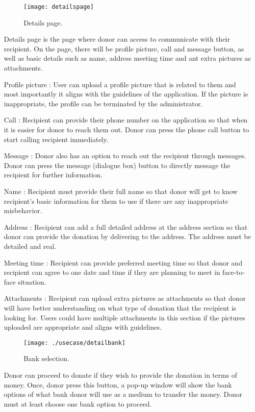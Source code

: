 \documentclass[conference]{IEEEtran}
\begin{document}
\begin{figure}[h!]
\texttt{[image: detailspage]}
\centering
\caption{Details page.}
\end{figure}

Details page is the page where donor can access to communicate with their recipient. On the page, there will be profile picture, call and message button, as well as basic details such as name, address meeting time and ant extra pictures as attachments.

Profile picture : User can upload a profile picture that is related to them and most importantly it aligns with the guidelines of the application. If the picture is inappropriate, the profile can be terminated by the administrator.

Call : Recipient can provide their phone number on the application so that when it is easier for donor to reach them out. Donor can press the phone call button to start calling recipient immediately. 

Message : Donor also has an option to reach out the recipient through messages. Donor can press the message (dialogue box) button to directly message the recipient for further information.

Name : Recipient must provide their full name so that donor will get to know recipient’s basic information for them to use if there are any inappropriate misbehavior. 

Address : Recipient can add a full detailed address at the address section so that donor can provide the donation by delivering to the address. The address must be detailed and real. 

Meeting time : Recipient can provide preferred meeting time so that donor and recipient can agree to one date and time if they are planning to meet in face-to-face situation. 

Attachments : Recipient can upload extra pictures as attachments so that donor will have better understanding on what type of donation that the recipient is looking for. Users could have multiple attachments in this section if the pictures uploaded are appropriate and aligns with guidelines.

\begin{figure}[h!]
\texttt{[image: ./usecase/detailbank]}
\centering
\caption{Bank selection.}
\end{figure}

Donor can proceed to donate if they wish to provide the donation in terms of money. Once, donor press this button, a pop-up window will show the bank options of what bank donor will use as a medium to transfer the money. Donor must at least choose one bank option to proceed.
\end{document}

